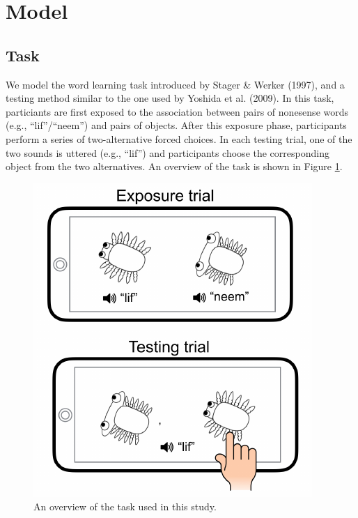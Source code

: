 \documentclass[10pt, letterpaper]{article}
\newenvironment{CodeChunk}{}{}
\begin{document}
\section{Model}\label{model}

\subsection{Task}\label{task}

We model the word learning task introduced by Stager \& Werker (1997),
and a testing method similar to the one used by Yoshida et al. (2009).
In this task, particiants are first exposed to the association between
pairs of nonesense words (e.g., ``lif''/``neem'') and pairs of objects.
After this exposure phase, participants perform a series of
two-alternative forced choices. In each testing trial, one of the two
sounds is uttered (e.g., ``lif'') and participants choose the
corresponding object from the two alternatives. An overview of the task
is shown in Figure \ref{fig:task}.

\begin{CodeChunk}
\begin{figure}[t]

{\centering \includegraphics{figs/task-1} 

}

\caption{\label{fig:task}An overview of the task used in this study.}\label{fig:task}
\end{figure}
\end{CodeChunk}
\end{document}
